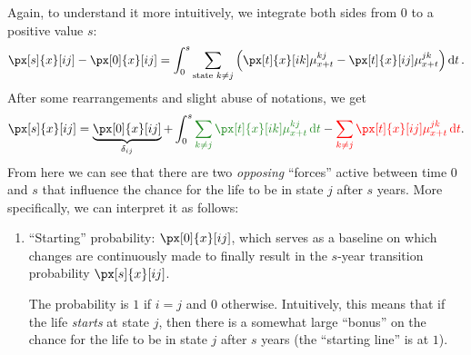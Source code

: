 \begin{enumerate}
Again, to understand it more intuitively, we integrate both sides from \(0\) to
a positive value \(s\):
\[
\px[s]{x}[ij]-\px[0]{x}[ij]=
\int_{0}^{s}\sum_{\text{state }k\ne j}^{}\qty(\px[t]{x}[ik]\mu_{x+t}^{kj}-\px[t]{x}[ij]\mu_{x+t}^{jk})\dd{t}.
\]
After some rearrangements and slight abuse of notations, we get
\[
\px[s]{x}[ij]=\underbrace{\px[0]{x}[ij]}_{\delta_{ij}}+
\int_{0}^{s}\gc{\sum_{k\ne j}^{}\px[t]{x}[ik]\mu_{x+t}^{kj}\dd{t}}
-\rc{\sum_{k\ne j}^{}\px[t]{x}[ij]\mu_{x+t}^{jk}\dd{t}}.
\]
From here we can see that there are two \emph{opposing} ``forces''
 active between time \(0\) and \(s\) that influence the
chance for the life to be in state \(j\) after \(s\) years. More specifically,
we can interpret it as follows:
\begin{enumerate}[label={(\arabic*)}]
\item ``Starting'' probability: \(\px[0]{x}[ij]\), which serves as a baseline
on which changes are continuously made to finally result in the \(s\)-year
transition probability \(\px[s]{x}[ij]\).

The probability is \(1\) if \(i=j\) and \(0\) otherwise. Intuitively, this
means that if the life \emph{starts} at state \(j\), then there is a somewhat
large ``bonus'' on the chance for the life to be in state \(j\) after \(s\)
years (the ``starting line'' is at \(1\)).


\end{enumerate}
\end{enumerate}
